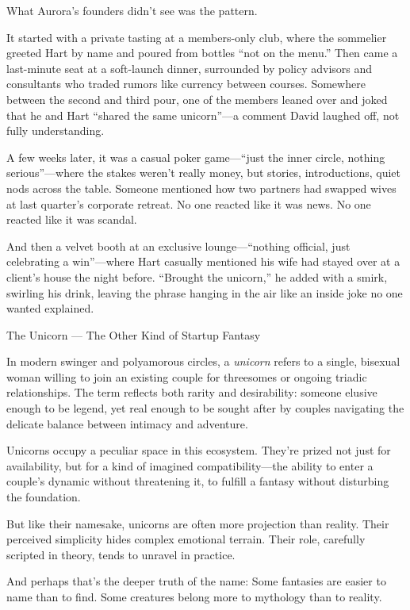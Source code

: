 \medskip

What Aurora’s founders didn’t see was the pattern.

It started with a private tasting at a members-only club, where the sommelier greeted Hart by name and poured from bottles “not on the menu.” Then came a last-minute seat at a soft-launch dinner, surrounded by policy advisors and consultants who traded rumors like currency between courses. Somewhere between the second and third pour, one of the members leaned over and joked that he and Hart “shared the same unicorn”—a comment David laughed off, not fully understanding.  

A few weeks later, it was a casual poker game—“just the inner circle, nothing serious”—where the stakes weren’t really money, but stories, introductions, quiet nods across the table. Someone mentioned how two partners had swapped wives at last quarter’s corporate retreat. No one reacted like it was news. No one reacted like it was scandal.  

And then a velvet booth at an exclusive lounge—“nothing official, just celebrating a win”—where Hart casually mentioned his wife had stayed over at a client’s house the night before. “Brought the unicorn,” he added with a smirk, swirling his drink, leaving the phrase hanging in the air like an inside joke no one wanted explained.  

\medskip

\begin{HistoricalSidebar}{The Unicorn --- The Other Kind of Startup Fantasy}

  In modern swinger and polyamorous circles, a \textit{unicorn} refers to a single, bisexual woman willing to join an existing couple for threesomes or ongoing triadic relationships. The term reflects both rarity and desirability: someone elusive enough to be legend, yet real enough to be sought after by couples navigating the delicate balance between intimacy and adventure.

  \medskip
  
  Unicorns occupy a peculiar space in this ecosystem. They’re prized not just for availability, but for a kind of imagined compatibility—the ability to enter a couple’s dynamic without threatening it, to fulfill a fantasy without disturbing the foundation.

  \medskip
  
  But like their namesake, unicorns are often more projection than reality. Their perceived simplicity hides complex emotional terrain. Their role, carefully scripted in theory, tends to unravel in practice.

  \medskip
  
  And perhaps that’s the deeper truth of the name:  
  Some fantasies are easier to name than to find.  
  Some creatures belong more to mythology than to reality.
  
\end{HistoricalSidebar}


